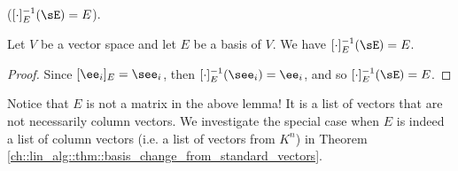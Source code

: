 \begin{lemma}
    \label{ch::lin_alg::lemma::basis_inverse}
    ($[\cdot]_E^{-1}(\sE) = E$).

    Let $V$ be a vector space and let $E$ be a basis of $V$. We have $[\cdot]_E^{-1}(\sE) = E$. 
\end{lemma}

\begin{proof}
    Since $[\ee_i]_E = \see_i$, then $[\cdot]_E^{-1}(\see_i) = \ee_i$, and so $[\cdot]_E^{-1}(\sE) = E$. 
\end{proof}

Notice that $E$ is not a matrix in the above lemma! It is a list of vectors that are not necessarily column vectors. We investigate the special case when $E$ is indeed a list of column vectors (i.e. a list of vectors from $K^n$) in Theorem \ref{ch::lin_alg::thm::basis_change_from_standard_vectors}.

